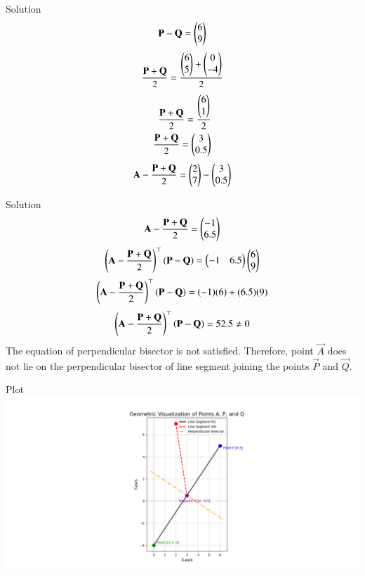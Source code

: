 \documentclass{beamer}
\begin{document}
\begin{frame}{Solution}
   \begin{align}
        \mathbf{P}-\mathbf{Q}=\begin{pmatrix}6\\9\end{pmatrix}
\end{align}
\begin{align}
    \frac{\mathbf{P}+\mathbf{Q}}{2}={\frac{\begin{pmatrix}6\\5\end{pmatrix}+\begin{pmatrix}0\\-4\end{pmatrix}}{2}}
\end{align}
\begin{align}
    \frac{\mathbf{P}+\mathbf{Q}}{2}={\frac{\begin{pmatrix}6\\1\end{pmatrix}}{2}}\\
    \frac{\mathbf{P}+\mathbf{Q}}{2}=\begin{pmatrix}3\\0.5\end{pmatrix}   
\end{align}
\begin{align}
    \mathbf{A}-\frac{\mathbf{P}+\mathbf{Q}}{2}=\begin{pmatrix}2\\7\end{pmatrix}-\begin{pmatrix}3\\0.5\end{pmatrix} 
\end{align}
\end{frame}
\begin{frame}{Solution}
\begin{align}
    \mathbf{A}-\frac{\mathbf{P}+\mathbf{Q}}{2}=\begin{pmatrix}-1\\6.5\end{pmatrix}   
\end{align}
\begin{align}
    \left(\mathbf{A}-\frac{\mathbf{P}+\mathbf{Q}}{2}\right)^\top\left(\mathbf{P}-\mathbf{Q}\right)=\begin{pmatrix}-1&6.5\end{pmatrix}\begin{pmatrix}6\\9\end{pmatrix}
\end{align}
\begin{align}
    \left(\mathbf{A}-\frac{\mathbf{P}+\mathbf{Q}}{2}\right)^\top\left(\mathbf{P}-\mathbf{Q}\right)=(-1)(6)+(6.5)(9)
\end{align}
\begin{align}
    \left(\mathbf{A}-\frac{\mathbf{P}+\mathbf{Q}}{2}\right)^\top\left(\mathbf{P}-\mathbf{Q}\right)=52.5\neq0
\end{align}
The equation of perpendicular bisector is not satisfied.
Therefore, point $\vec{A}$ does not lie on the perpendicular bisector of line segment joining the points $\vec{P}$ and $\vec{Q}$.
\end{frame}
\begin{frame}{Plot}
    \centering
    \includegraphics[width=\columnwidth, height=0.8\textheight, keepaspectratio]{figs/fig1.png} 
\end{frame}
\end{document}
